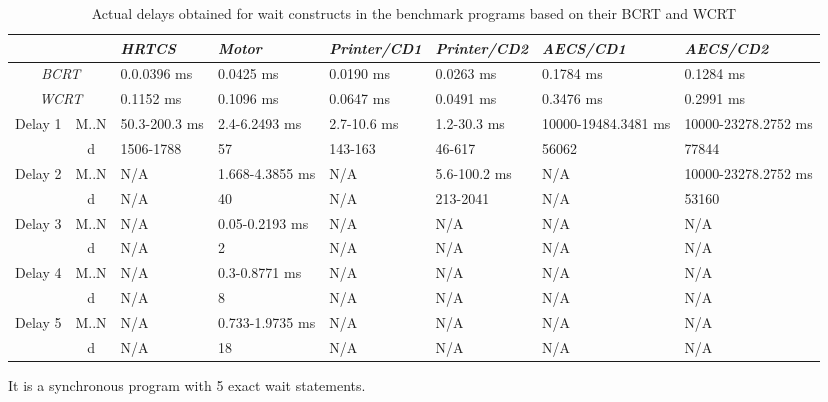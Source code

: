 {\renewcommand{\arraystretch}{0.6}
\begin{table*}[t!]
\centering
	\caption{Actual delays obtained for wait constructs in the
benchmark programs based on their BCRT and WCRT}
\begin{tabular}{ c c l l l l l l }
	\toprule
	\multicolumn{2}{c}{} & \emph{HRTCS} & \emph{Motor} & \emph{Printer/CD1} &
	\emph{Printer/CD2} & \emph{AECS/CD1} &	\emph{AECS/CD2} \\ 
	\midrule
	\multicolumn{2}{c}{\emph{BCRT}}	& 0.0.0396 ms	& 0.0425 ms & 0.0190 ms &
	0.0263 ms & 0.1784 ms & 0.1284 ms\\ 
	\cmidrule(r){1-8}
	\multicolumn{2}{c}{\emph{WCRT}} &0.1152 ms & 0.1096 ms & 0.0647 ms
	& 0.0491 ms & 0.3476 ms & 0.2991 ms\\ 
	\cmidrule(r){1-8}

	\multirow{2}{*}{Delay 1} & M..N & 50.3-200.3 ms	& 2.4-6.2493 ms	  &
	2.7-10.6 ms & 1.2-30.3 ms & 10000-19484.3481 ms& 10000-23278.2752 ms \\
	\cmidrule(r){2-8}
	& d &1506-1788 & 57 & 143-163 & 46-617 & 56062 &77844\\ 
	\cmidrule(r){1-8}
	\multirow{2}{*}{Delay 2} & M..N & N/A & 1.668-4.3855 ms & N/A &
	5.6-100.2 ms & N/A &10000-23278.2752 ms\\ 
	\cmidrule(r){2-8}
	& d & N/A & 40 & N/A & 213-2041 & N/A &53160\\ 
	\cmidrule(r){1-8}
	\multirow{2}{*}{Delay 3} & M..N & N/A & 0.05-0.2193 ms & N/A & N/A & N/A
	&N/A\\ 
	\cmidrule(r){2-8}
	& d & N/A & 2 & N/A & N/A & N/A &N/A\\ 
	\cmidrule(r){1-8}
	\multirow{2}{*}{Delay 4} & M..N & N/A & 0.3-0.8771 ms & N/A & N/A & N/A
	&N/A\\ 
	\cmidrule(r){2-8}
	& d & N/A & 8 & N/A & N/A & N/A &N/A\\ 
	\cmidrule(r){1-8}
	\multirow{2}{*}{Delay 5} & M..N & N/A & 0.733-1.9735 ms & N/A & N/A & N/A
	&N/A\\ 
	\cmidrule(r){2-8}
	& d & N/A & 18 & N/A
	& N/A & N/A &N/A\\ \bottomrule
\end{tabular}
\label{fig:comparison}
\end{table*}
}


 It is a
synchronous program with 5 exact wait statements. 


